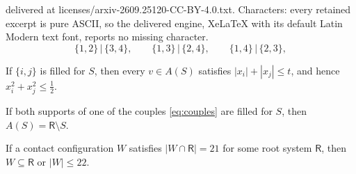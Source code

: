 \documentclass[10pt,a4paper]{amsart}
\newcommand{\Rt}{\mathsf{R}}                 %
\begin{document}
delivered at licenses/arxiv-2609.25120-CC-BY-4.0.txt. Characters: every retained excerpt is pure ASCII, so the delivered engine, XeLaTeX with its default Latin Modern text font, reports no missing character.
\begin{equation}\label{eq:couples}
  \{1,2\}\,\big|\,\{3,4\},
  \qquad
  \{1,3\}\,\big|\,\{2,4\},
  \qquad
  \{1,4\}\,\big|\,\{2,3\},
\end{equation}

\begin{lem}\label{lem:filled-support}
If $\{i,j\}$ is filled for $S$, then every $v\in A(S)$ satisfies
$|x_i|+|x_j|\le t$, and hence $x_i^2+x_j^2\le\tfrac12$.
\end{lem}

\begin{lem}\label{lem:filled-couple}
If both supports of one of the couples \eqref{eq:couples} are filled for
$S$, then $A(S)=\Rt\setminus S$.
\end{lem}

\begin{prop}\label{prop:meet21}
If a contact configuration $W$ satisfies $|W\cap\Rt|=21$ for some root
system $\Rt$, then $W\subseteq\Rt$ or $|W|\le22$.
\end{prop}
\end{document}
